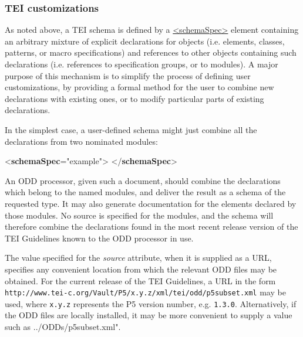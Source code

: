 \subsubsection[{TEI customizations}]{TEI customizations}\label{TDbuild}\par
As noted above, a TEI schema is defined by a \hyperref[TEI.schemaSpec]{<schemaSpec>} element containing an arbitrary mixture of explicit declarations for objects (i.e. elements, classes, patterns, or macro specifications) and references to other objects containing such declarations (i.e. references to specification groups, or to modules). A major purpose of this mechanism is to simplify the process of defining user customizations, by providing a formal method for the user to combine new declarations with existing ones, or to modify particular parts of existing declarations.\par
In the simplest case, a user-defined schema might just combine all the declarations from two nominated modules: \par\bgroup{}\exampleFont \begin{shaded}\noindent\mbox{}{<\textbf{schemaSpec}\hspace*{1em}{ident}="{example}">}\mbox{}\newline 
{}\mbox{}\newline 
{}\mbox{}\newline 
{</\textbf{schemaSpec}>}\end{shaded}\egroup\par \noindent  An ODD processor, given such a document, should combine the declarations which belong to the named modules, and deliver the result as a schema of the requested type. It may also generate documentation for the elements declared by those modules. No source is specified for the modules, and the schema will therefore combine the declarations found in the most recent release version of the TEI Guidelines known to the ODD processor in use.\par
The value specified for the {\itshape source} attribute, when it is supplied as a URL, specifies any convenient location from which the relevant ODD files may be obtained. For the current release of the TEI Guidelines, a URL in the form \texttt{http://www.tei-c.org/Vault/P5/x.y.z/xml/tei/odd/p5subset.xml} may be used, where \texttt{x.y.z} represents the P5 version number, e.g. \texttt{1.3.0}. Alternatively, if the ODD files are locally installed, it may be more convenient to supply a value such as ../ODDs/p5subset.xml". \par
